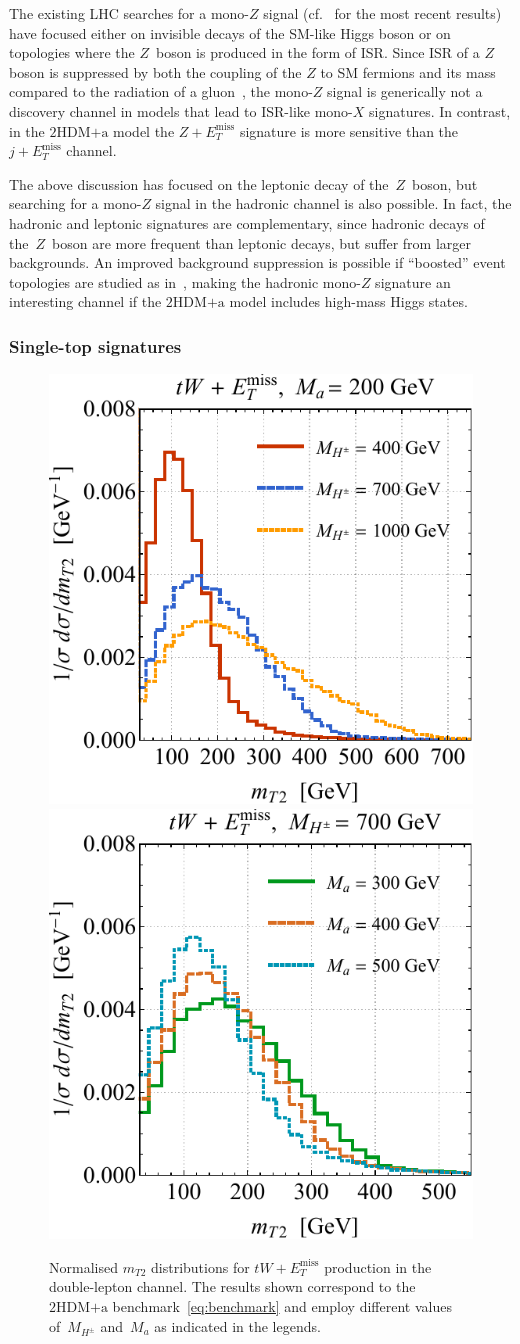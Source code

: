\documentclass[a4paper, 11pt,notoc]{article}
\newcommand{\MET}{\ensuremath{E_T^\mathrm{miss}}\xspace}
\newcommand{\ma}{\ensuremath{M_{a}}\xspace}
\newcommand{\mHc}{\ensuremath{M_{H^{\pm}}}\xspace}
\newcommand{\hdma}{\ensuremath{\textrm{2HDM+a}}\xspace}
\begin{document}
The existing LHC searches for a mono-$Z$ signal (cf.~\cite{Aaboud:2017bja,Sirunyan:2017qfc} for the most recent results) have focused either on invisible decays of the SM-like Higgs boson or on topologies where the $Z$~boson is produced in the form of ISR.  Since ISR of a $Z$ boson is suppressed by both the coupling of the $Z$ to SM fermions and its mass compared to the radiation of a gluon~\cite{Petriello:2008pu,Bell:2012rg,Carpenter:2012rg}, the mono-$Z$ signal is generically not a discovery channel in models that lead to ISR-like mono-$X$ signatures. In contrast, in the \hdma model the $Z+\MET$ signature is more sensitive than the $j+\MET$ channel.

The above discussion has focused on the leptonic decay of the~$Z$~boson, but searching for a mono-$Z$ signal in the hadronic channel is also possible. In fact, the hadronic and leptonic signatures  are complementary, since hadronic decays of the~$Z$~boson are more frequent than leptonic decays, but suffer from larger backgrounds. An improved background suppression is possible if ``boosted'' event topologies are studied as in~\cite{Aad:2013oja,Sirunyan:2017jix}, making the hadronic mono-$Z$ signature an interesting channel if the \hdma model includes high-mass Higgs states. 

\subsubsection{Single-top signatures}

\begin{figure}[t!]
\centering
\includegraphics[height=0.45\textwidth]{mt2l.pdf} \qquad 
\includegraphics[height=0.45\textwidth]{mt2r.pdf}
\vspace{2mm}
\caption{\label{fig:mt2spectra} Normalised $m_{T2}$ distributions for $tW+\MET$ production in the double-lepton channel.  The  results shown correspond to the \hdma benchmark~\eqref{eq:benchmark} and employ different values of~$\mHc$ and~$\ma$ as indicated in the legends.}
\end{figure}
\end{document}
